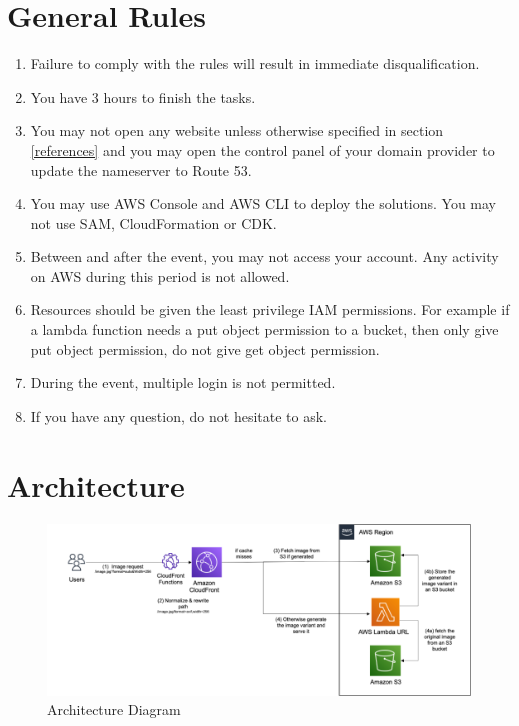 \documentclass{article}
\begin{document}
\section{General Rules}
\begin{enumerate}
    \item Failure to comply with the rules will result in immediate disqualification.
    \item You have 3 hours to finish the tasks.
    \item You may not open any website unless otherwise specified in section \ref{references} and you may open the control panel of your domain provider to update the nameserver to Route 53.
    \item You may use AWS Console and AWS CLI to deploy the solutions. You may not use SAM, CloudFormation or CDK.
    \item Between and after the event, you may not access your account. Any activity on AWS during this period is not allowed.
    \item Resources should be given the least privilege IAM permissions. For example if a lambda function needs a put object permission to a bucket, then only give put object permission, do not give get object permission.
    \item During the event, multiple login is not permitted.
    \item If you have any question, do not hesitate to ask.
\end{enumerate}
\section{Architecture}\label{architecture}
\begin{figure}[h]
\centering
\includegraphics[width=\textwidth]{architecture.png}
\caption{\label{fig:architecture}Architecture Diagram}
\end{figure}
\end{document}
